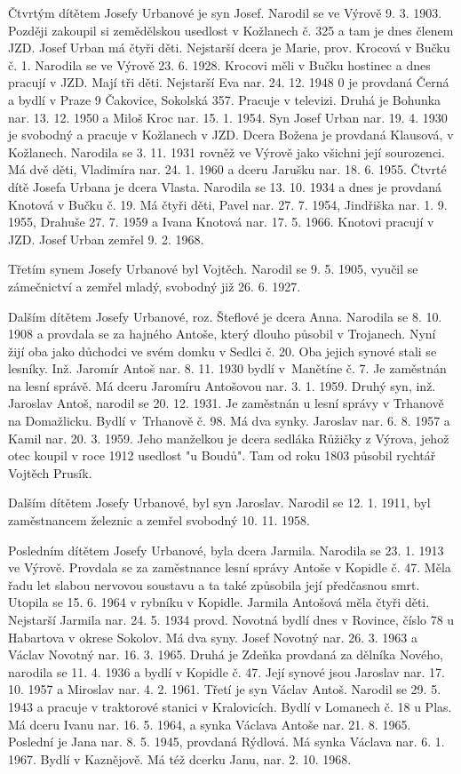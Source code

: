 \documentclass[../dejiny-rodu-prusiku.tex]{subfiles}
\begin{document}
Čtvrtým dítětem Josefy Urbanové je syn Josef. Narodil se ve Výrově 9. 3. 1903. Později zakoupil si zemědělskou usedlost v Kožlanech č. 325 a tam je dnes členem JZD. Josef Urban má čtyři děti. Nejstarší dcera je Marie, prov. Krocová v Bučku č. 1. Narodila se ve Výrově 23. 6. 1928. Krocovi měli v Bučku hostinec a dnes pracují v JZD. Mají tři děti. Nejstarší Eva nar. 24. 12. 1948 0 je provdaná Černá a bydlí v Praze 9 Čakovice, Sokolská 357. Pracuje v televizi. Druhá je Bohunka nar. 13. 12. 1950 a Miloš Kroc nar. 15. 1. 1954. Syn Josef Urban nar. 19. 4. 1930 je svobodný a pracuje v Kožlanech v JZD. Dcera Božena je provdaná Klausová, v Kožlanech. Narodila se 3. 11. 1931 rovněž ve Výrově jako všichni její sourozenci. Má dvě děti, Vladimíra nar. 24. 1. 1960 a dceru Jarušku nar. 18. 6. 1955. Čtvrté dítě Josefa Urbana je dcera Vlasta. Narodila se 13. 10. 1934 a dnes je provdaná Knotová v Bučku č. 19. Má čtyři děti, Pavel nar. 27. 7. 1954, Jindřiška nar. 1. 9. 1955, Drahuše 27. 7. 1959 a Ivana Knotová nar. 17. 5. 1966. Knotovi pracují v JZD. Josef Urban zemřel  9. 2.  1968.

Třetím synem Josefy Urbanové byl Vojtěch. Narodil se  9. 5. 1905, vyučil se zámečnictví a zemřel mladý, svobodný již 26. 6. 1927.

Dalším dítětem Josefy Urbanové, roz. Šteflové je dcera Anna. Narodila se 8. 10. 1908 a provdala se za hajného Antoše, který dlouho působil v Trojanech. Nyní žijí oba jako důchodci ve svém domku v Sedlci č. 20. Oba jejich synové stali se lesníky. Inž. Jaromír Antoš nar. 8. 11. 1930 bydlí v Manětíne č. 7. Je zaměstnán na lesní správě.  Má dceru Jaromíru Antošovou nar. 3. 1. 1959. Druhý syn, inž. Jaroslav Antoš, narodil se 20. 12. 1931. Je zaměstnán u lesní správy v Trhanově na Domažlicku. Bydlí v Trhanově č. 98. Má dva synky. Jaroslav nar. 6. 8. 1957 a Kamil nar. 20. 3. 1959. Jeho manželkou je dcera sedláka Růžičky z Výrova, jehož otec koupil v roce 1912 usedlost "u Boudů". Tam od roku 1803 působil rychtář Vojtěch Prusík.

Dalším dítětem Josefy Urbanové, byl syn Jaroslav. Narodil se 12. 1. 1911, byl zaměstnancem železnic a zemřel svobodný 10. 11. 1958.

Posledním dítětem Josefy Urbanové, byla dcera Jarmila. Narodila se 23. 1. 1913 ve Výrově. Provdala se za zaměst­nance lesní správy Antoše v Kopidle č. 47. Měla řadu let slabou nervovou soustavu a ta také způsobila její předčasnou smrt. Utopila se 15. 6. 1964 v rybníku v Kopidle. Jarmila Antošová měla čtyři děti. Nejstarší Jarmila nar. 24. 5. 1934 provd. Novotná bydlí dnes v Rovince, číslo 78 u Habartova v okrese Sokolov. Má dva syny. Josef Novotný nar. 26. 3. 1963 a Václav Novotný nar. 16. 3. 1965. Druhá je Zdeňka provdaná za dělníka Nového, naro­dila se 11. 4. 1936 a bydlí v Kopidle č. 47. Její synové jsou Jaroslav nar. 17. 10. 1957 a Miroslav nar. 4. 2. 1961. Třetí je syn Václav Antoš. Narodil se 29. 5. 1943 a pracuje v traktorové stanici v Kralovicích. Bydlí v Lomanech č. 18 u Plas. Má dceru Ivanu nar. 16. 5. 1964, a synka Václava Antoše nar. 21. 8. 1965. Poslední je Jana nar. 8. 5. 1945, provdaná Rýdlová. Má synka Václava nar. 6. 1. 1967. Bydlí v Kaznějově. Má též dcerku Janu, nar. 2. 10. 1968.
\end{document}
